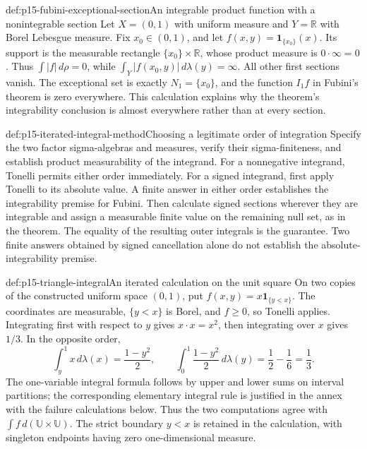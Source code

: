 \begin{hbexample}{def:p15-fubini-exceptional-section}{An integrable product function with a nonintegrable section}
Let \(X=(0,1)\) with uniform measure and \(Y=\mathbb R\) with
Borel Lebesgue measure. Fix \(x_0\in(0,1)\), and let
\(f(x,y)=\mathbf1_{\{x_0\}}(x)\). Its support is the measurable
rectangle \(\{x_0\}\times\mathbb R\), whose product measure is
\(0\cdot\infty=0\). Thus \(\int|f|\,d\rho=0\), while
\(\int_Y|f(x_0,y)|\,d\lambda(y)=\infty\).
All other first sections vanish. The exceptional set is exactly
\(N_1=\{x_0\}\), and the function \(I_1f\) in Fubini's theorem
is zero everywhere. This calculation explains why the theorem's
integrability conclusion is almost everywhere rather than at every section.
\end{hbexample}

\begin{hbmethod}{def:p15-iterated-integral-method}{Choosing a legitimate order of integration}
Specify the two factor sigma-algebras and measures, verify their
sigma-finiteness, and establish product measurability of the integrand.
For a nonnegative integrand, Tonelli permits either order immediately.
For a signed integrand, first apply Tonelli to its absolute value. A
finite answer in either order establishes the integrability premise for
Fubini. Then calculate signed sections wherever they are integrable and
assign a measurable finite value on the remaining null set, as in the
theorem. The equality of the resulting outer integrals is the guarantee.
Two finite answers obtained by signed cancellation alone do not establish
the absolute-integrability premise.
\end{hbmethod}

\begin{hbexample}{def:p15-triangle-integral}{An iterated calculation on the unit square}
On two copies of the constructed uniform space \((0,1)\), put
\(f(x,y)=x\mathbf1_{\{y<x\}}\). The coordinates are measurable,
\(\{y<x\}\) is Borel, and \(f\geq0\), so Tonelli applies.
Integrating first with respect to \(y\) gives \(x\cdot x=x^2\),
then integrating over \(x\) gives \(1/3\). In the opposite order,
\[
 \int_y^1 x\,d\lambda(x)=\frac{1-y^2}{2},\qquad
 \int_0^1\frac{1-y^2}{2}\,d\lambda(y)
                   =\frac12-\frac16=\frac13.
\]
The one-variable integral formula follows by upper and lower sums on
interval partitions; the corresponding elementary integral rule is
justified in the annex with the failure calculations below. Thus the
two computations agree with \(\int f\,d(\mathbb U\times\mathbb U)\).
The strict boundary \(y<x\) is retained in the calculation, with
singleton endpoints having zero one-dimensional measure.
\end{hbexample}


